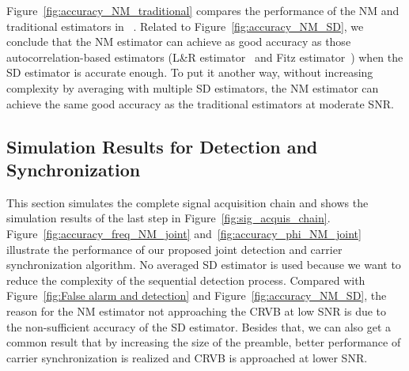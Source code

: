 Figure~\ref{fig:accuracy_NM_traditional} compares the performance of the NM and traditional estimators in ~\cite{Kay_89,Luise_Reggiannini_95,Fitz_94}.
Related to Figure~\ref{fig:accuracy_NM_SD}, we conclude that the NM estimator can achieve as good accuracy as those autocorrelation-based estimators 
(L\&R estimator~\cite{Luise_Reggiannini_95} and Fitz estimator~\cite{Fitz_94})
when the SD estimator is accurate enough. To put it another way, without increasing complexity by averaging with multiple SD estimators, 
the NM estimator can achieve the same good accuracy as the traditional estimators at moderate SNR.

\subsection{Simulation Results for Detection and Synchronization}

This section simulates the complete signal acquisition chain and shows the simulation results of the last step in Figure~\ref{fig:sig_acquis_chain}.
Figure~\ref{fig:accuracy_freq_NM_joint} and~\ref{fig:accuracy_phi_NM_joint} illustrate the performance of our proposed joint detection and 
carrier synchronization algorithm. No averaged SD estimator is used because we want to reduce the complexity of the sequential detection process.
Compared with Figure~\ref{fig:False alarm and detection} and Figure~\ref{fig:accuracy_NM_SD}, the reason for the NM estimator not approaching the CRVB at low SNR
is due to the non-sufficient accuracy of the SD estimator. 
Besides that, we can also get a common result that by increasing
the size of the preamble, better performance of carrier synchronization is realized and CRVB is approached at lower SNR.
